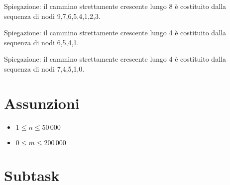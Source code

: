 Spiegazione: il cammino strettamente crescente lungo 8 è costituito dalla sequenza di nodi 9,7,6,5,4,1,2,3. 

\vspace{0.5cm}

Spiegazione: il cammino strettamente crescente lungo 4 è costituito dalla sequenza di nodi 6,5,4,1. 

\vspace{0.5cm}

Spiegazione: il cammino strettamente crescente lungo 4 è costituito dalla sequenza di nodi 7,4,5,1,0. 

\section*{Assunzioni}

  \begin{itemize}
    \item $1 \le n \le 50\,000$
    \item $0 \le m \le 200\,000$
  \end{itemize}


\section*{Subtask}

